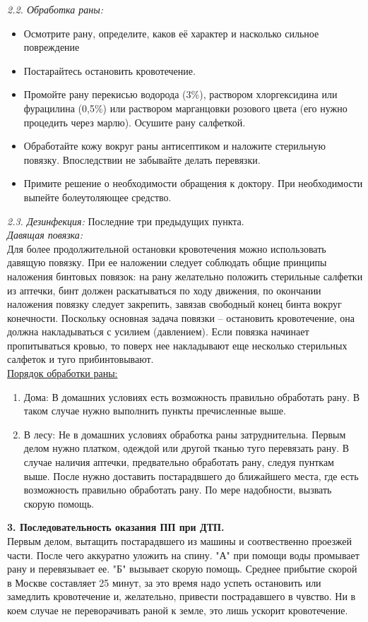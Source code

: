 \documentclass[a4paper, 12pt]{article}
\theoremstyle{definition}
\begin{document}
    \textit{2.2. Обработка раны:}
    \begin{itemize}
        \item Осмотрите рану, определите, каков её характер и насколько сильное повреждение 
        \item Постарайтесь остановить кровотечение. 
        \item Промойте рану перекисью водорода (3\%), раствором хлоргексидина или фурацилина (0,5\%) или раствором марганцовки розового цвета (его нужно процедить через марлю). Осушите рану салфеткой. 
        \item Обработайте кожу вокруг раны антисептиком и наложите стерильную повязку. Впоследствии не забывайте делать перевязки. 
        \item Примите решение о необходимости обращения к доктору. При необходимости выпейте болеутоляющее средство. 
    \end{itemize} 
    \newpage
    \textit{2.3. Дезинфекция:} Последние три предыдущих пункта.\\
    \textit{Давящая повязка:}\\
    Для более продолжительной остановки кровотечения можно использовать давящую повязку. При ее наложении следует соблюдать общие принципы наложения бинтовых повязок: на рану желательно положить стерильные салфетки из аптечки, бинт должен раскатываться по ходу движения, по окончании наложения повязку следует закрепить, завязав свободный конец бинта вокруг конечности. Поскольку основная задача повязки – остановить кровотечение, она должна накладываться с усилием (давлением). Если повязка начинает пропитываться кровью, то поверх нее накладывают еще несколько стерильных салфеток и туго прибинтовывают.\\
    \underline{Порядок обработки раны:}
    \begin{enumerate}
        \item Дома: В домашних условиях есть возможность правильно обработать рану. В таком случае нужно выполнить пункты пречисленные выше.
        \item В лесу: Не в домашних условиях обработка раны затруднительна. Первым делом нужно платком, одеждой или другой тканью туго перевязать рану. В случае наличия аптечки, предвательно обработать рану, следуя пунткам выше. После нужно доставить постарадвшего до ближайшего места, где есть возможность правильно обработать рану. По мере надобности, вызвать скорую помощь.
    \end{enumerate}
    \textbf{3. Последовательность оказания ПП при ДТП.}\\
    Первым делом, вытащить постарадвшего из машины и соотвественно проезжей части. После чего аккуратно уложить на спину. "А" при помощи воды промывает рану и перевязывает ее. "Б" вызывает скорую помощь. Среднее прибытие скорой в Москве составляет 25 минут, за это время надо успеть остановить или замедлить кровотечение и, желательно, привести пострадавшего в чувство. Ни в коем случае не переворачивать раной к земле, это лишь ускорит кровотечение.
     
\end{document}
